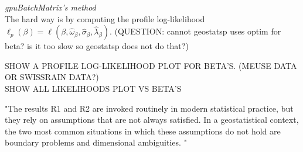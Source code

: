 \documentclass{article}\usepackage[]{graphicx}\usepackage[]{color}
\DeclareMathOperator*{\argmax}{argmax}
\newcommand{\prog}[1]{\textsf{#1}}
\newcommand{\pkg}[1]{\textbf{\emph{#1}}}
\def\T{{\footnotesize {^{_{\sf T}}}}}
\begin{document}

\textit{gpuBatchMatrix's method}\vspace{0.5cm}\\
The hard way is by computing the profile log-likelihood $\ell_p(\beta) =\ell(\beta, \hat{\omega}_{\beta},\hat{\sigma}_{\beta}, \hat{\lambda}_{\beta})$. (QUESTION: cannot geostatsp uses optim for beta? is it too slow so geostatsp does not do that?)

SHOW A PROFILE LOG-LIKELIHOOD PLOT FOR BETA'S. (MEUSE DATA OR SWISSRAIN DATA?)\\
SHOW ALL LIKELIHOODS PLOT VS BETA'S


"The results R1 and R2 are invoked routinely in modern statistical practice, but they rely on assumptions that are not always satisfied. In a geostatistical context, the two most common situations in which these assumptions do not hold are boundary problems and dimensional ambiguities. "

%
%

\end{document}
